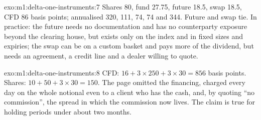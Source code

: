 \begin{solution}{exo:m1:delta-one-instruments:7}
Shares 80, fund 27.75, future 18.5, swap 18.5, CFD 86 basis points;
annualised 320, 111, 74, 74 and 344. Future and swap tie. In practice: the
future needs no documentation and has no counterparty exposure beyond the
clearing house, but exists only on the index and in fixed sizes and
expiries; the swap can be on a custom basket and pays more of the dividend,
but needs an agreement, a credit line and a dealer willing to quote.
\end{solution}

\begin{solution}{exo:m1:delta-one-instruments:8}
CFD: $16 + 3 \times 250 + 3 \times 30 = 856$ basis points. Shares: $10 + 50 +
3 \times 30 = 150$. The page omitted the financing, charged every day on the
whole notional even to a client who has the cash, and, by quoting ``no
commission'', the spread in which the commission now lives. The claim is
true for holding periods under about two months.
\end{solution}

